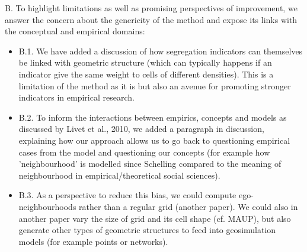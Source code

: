 \documentclass[11pt,a4paper,sans]{moderncv}        %
\begin{document}
 \medskip
B. To highlight limitations as well as promising perspectives of improvement, we answer the concern about the genericity of the method and expose its links with the conceptual and empirical domains:

 \begin{itemize}
 
  \item B.1. We have added a discussion of how segregation indicators can themselves be linked with geometric structure (which can typically happens if an indicator give the same weight to cells of different densities). This is a limitation of the method as it is but also an avenue for promoting stronger indicators in empirical research. %
  
  \item B.2. To inform the interactions between empirics, concepts and models as discussed by Livet et al., 2010, we added a paragraph in discussion, explaining how our approach allows us to go back to questioning empirical cases from the model and questioning our concepts (for example how 'neighbourhood' is modelled since Schelling compared to the meaning of neighbourhood in empirical/theoretical social sciences). 
  
  \item B.3. As a perspective to reduce this bias, we could compute ego-neighbourhoods rather than a regular grid (another paper). We could also in another paper vary the size of grid and its cell shape (cf. MAUP), but also generate other types of geometric structures to feed into geosimulation models (for example points or networks). %
\end{itemize}

\bigskip


 
\end{document}
